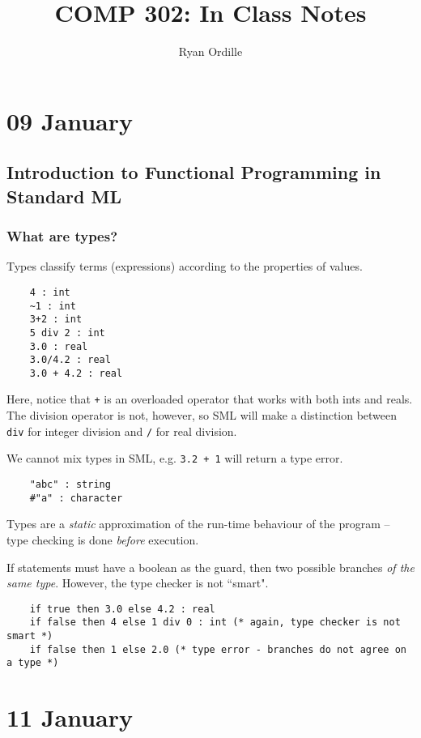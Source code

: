 \documentclass[11pt]{article}
\title{COMP 302: In Class Notes}
\author{Ryan Ordille}
\begin{document}
\maketitle

\section{09 January} %
\subsection{Introduction to Functional Programming in Standard ML}
\subsubsection{What are types?}
Types classify terms (expressions) according to the properties of values.

\begin{verbatim}
    4 : int
    ~1 : int
    3+2 : int
    5 div 2 : int
    3.0 : real
    3.0/4.2 : real
    3.0 + 4.2 : real
\end{verbatim}

Here, notice that \verb~+~ is an overloaded operator that works with both ints and reals. The division operator is not, however, so SML will make a distinction between \verb~div~ for integer division and \verb~/~ for real division.

We cannot mix types in SML, e.g. \verb~3.2 + 1~ will return a type error.

\begin{verbatim}
    "abc" : string
    #"a" : character
\end{verbatim}

Types are a \emph{static} approximation of the run-time behaviour of the program -- type checking is done \emph{before} execution.

If statements must have a boolean as the guard, then two possible branches \emph{of the same type}. However, the type checker is not ``smart".

\begin{verbatim}
    if true then 3.0 else 4.2 : real
    if false then 4 else 1 div 0 : int (* again, type checker is not smart *)
    if false then 1 else 2.0 (* type error - branches do not agree on a type *)
\end{verbatim}

\section{11 January} %
\end{document}
